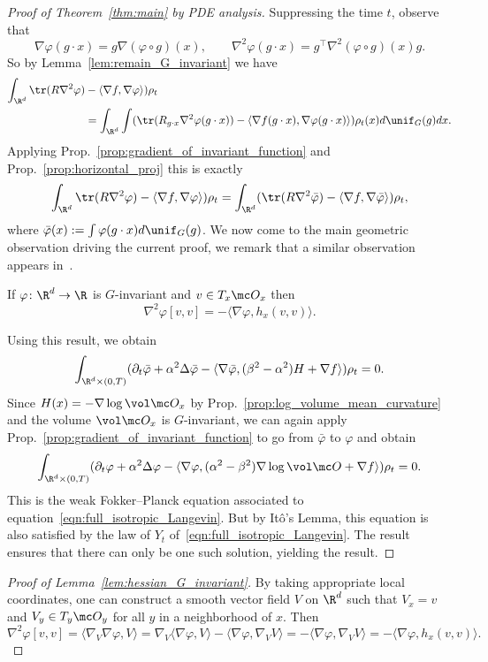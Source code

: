 \documentclass[twoside,a4paper,11pt]{article}
\renewcommand{\phi}{\varphi}
\theoremstyle{plain}
\begin{document}
\begin{proof}[Proof of Theorem~\ref{thm:main} by PDE analysis]
Suppressing the time $t$, observe that
$$
 \nabla \phi(g\cdot x) = g \nabla (\phi \circ g)(x),\quad \quad 
 \nabla^2 \phi(g \cdot x) = g^\top \nabla^2 (\phi \circ g)(x) g.
$$
So by Lemma~\ref{lem:remain_G_invariant} we have
\begin{align*}
\int_{\R^d} \tr(R\nabla^2 \phi) &- \langle \nabla f, \nabla \phi\rangle )\rho_t \\
&=  
\int_{\R^d} \int (\tr(R_{g\cdot x} \nabla^2 \phi(g \cdot x))
- \langle \nabla f(g\cdot x), \nabla \phi(g \cdot x) \rangle)
\rho_t(x)
d \unif_G(g)d x.
\end{align*}
Applying Prop.~\ref{prop:gradient_of_invariant_function} and
Prop.~\ref{prop:horizontal_proj}
this is exactly
$$
\int_{\R^d} \tr(R\nabla^2 \phi) - \langle \nabla f, \nabla \phi\rangle )\rho_t
= \int_{\R^d} (\tr(R \nabla^2 \bar \phi)
-\langle \nabla f, \nabla \bar \phi \rangle) \rho_t,
$$ where $\bar \phi(x) := \int \phi(g\cdot x) d \unif_G(g)$.
We now come to the main
geometric observation driving the current
proof, we remark
that a similar observation
appears in~\cite[Theorem 3.7]{helgason1984groups}.
\begin{lemma}
\label{lem:hessian_G_invariant}
If $\phi \colon \R^d \to \R$ is $G$-invariant
and $v \in T_x \mc O_x$
then
$$
\nabla^2 \phi[v, v] = - \langle \nabla \phi, h_x(v, v)\rangle.
$$
\end{lemma}
Using this result, we obtain
$$
\int_{\R^d\times (0, T)} (\partial_t \bar \phi + 
\alpha^2 \Delta \bar \phi - \langle \nabla \bar \phi,
(\beta^2 - \alpha^2) H +  \nabla f \rangle) \rho_t = 0.
$$
Since $H(x) = - \nabla \log \vol \mc O_x$ by Prop.~\ref{prop:log_volume_mean_curvature}
and the volume $\vol \mc O_x$ is $G$-invariant,
we can again apply Prop.~\ref{prop:gradient_of_invariant_function}
to go from $\bar \phi$ to $\phi$ and obtain
$$
\int_{\R^d\times (0, T)} (\partial_t  \phi + 
\alpha^2 \Delta \phi - \langle \nabla  \phi,
(\alpha^2 - \beta^2) \nabla \log \vol \mc O +  \nabla f \rangle) \rho_t = 0.
$$
This is the weak Fokker--Planck equation associated
to equation~\eqref{eqn:full_isotropic_Langevin}.
But by Itô's Lemma, this equation is also satisfied by
the law of $Y_t$ of~\eqref{eqn:full_isotropic_Langevin}.
The result~\cite[Theorem 9.4.3]{bogachev2022fokker}
ensures that there can only be one such solution, yielding the result.
\end{proof}

\begin{proof}[Proof of Lemma~\ref{lem:hessian_G_invariant}]
By taking appropriate local coordinates,
one can construct a smooth vector field $V$ on $\R^d$ 
such that $V_x = v$ and $V_y \in T_y \mc O_y$
for all $y$ in a neighborhood of $x$.
Then
$$
\nabla^2 \phi[v,v]=
\langle \nabla_V \nabla \phi, V \rangle 
= \nabla_V \langle \nabla \phi, V \rangle - \langle \nabla \phi, 
\nabla_V V \rangle = -\langle \nabla \phi, \nabla_V V\rangle
= -\langle \nabla \phi, h_x(v, v)\rangle.
$$
\end{proof}
\end{document}
